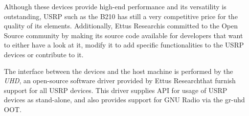 Although these devices provide high-end performance and its versatility is outstanding, \ac{USRP} such as the B210 has still a very competitive price for the quality of its elements. Additionally, Ettus Research\texttrademark is committed to the Open Source community by making its source code available for developers that want to either have a look at it, modify it to add specific functionalities to the \ac{USRP} devices or contribute to it.

The interface between the devices and the host machine is performed by the \emph{\ac{UHD}}, an open-source software driver provided by Ettus Research\texttrademark that furnish support for all \ac{USRP} devices. This driver supplies API for usage of \ac{USRP} devices as stand-alone, and also provides support for GNU Radio via the gr-uhd \ac{OOT}.

